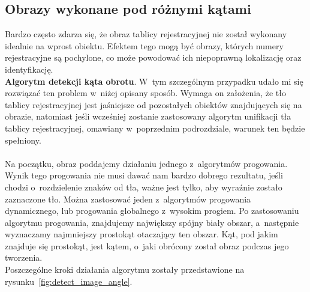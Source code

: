 \subsection{Obrazy wykonane pod różnymi kątami}
Bardzo często zdarza się, że obraz tablicy rejestracyjnej nie został wykonany idealnie na wprost obiektu. Efektem tego mogą być obrazy, których numery rejestracyjne są pochylone, co może powodować ich niepoprawną lokalizację oraz identyfikację. \\
\textbf{Algorytm detekcji kąta obrotu}. W~tym szczególnym przypadku udało mi się rozwiązać ten problem w~niżej opisany sposób. Wymaga on założenia, że tło tablicy rejestracyjnej jest jaśniejsze od pozostałych obiektów znajdujących się na obrazie, natomiast jeśli wcześniej zostanie zastosowany algorytm unifikacji tła tablicy rejestracyjnej, omawiany w~poprzednim podrozdziale, warunek ten będzie spełniony.
\paragraph{}
Na początku, obraz poddajemy działaniu jednego z~algorytmów progowania. Wynik tego progowania nie musi dawać nam bardzo dobrego rezultatu, jeśli chodzi o~rozdzielenie znaków od tła, ważne jest tylko, aby wyraźnie zostało zaznaczone tło. Można zastosować jeden z~algorytmów progowania dynamicznego, lub progowania globalnego z~wysokim progiem. Po zastosowaniu algorytmu progowania, znajdujemy największy spójny biały obszar, a~następnie wyznaczamy najmniejszy prostokąt otaczający ten obszar. Kąt, pod jakim znajduje się prostokąt, jest kątem, o~jaki obrócony został obraz podczas jego tworzenia.\\
Poszczególne kroki działania algorytmu zostały przedstawione na rysunku~\ref{fig:detect_image_angle}.

